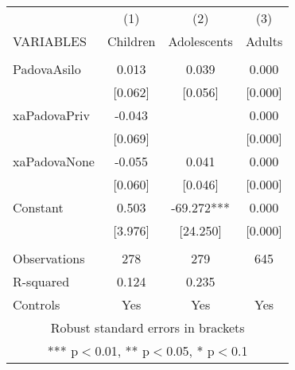 \begin{tabular}{lccc} \hline
 & (1) & (2) & (3) \\
VARIABLES & Children & Adolescents & Adults \\ \hline
 &  &  &  \\
PadovaAsilo & 0.013 & 0.039 & 0.000 \\
 & [0.062] & [0.056] & [0.000] \\
xaPadovaPriv & -0.043 &  & 0.000 \\
 & [0.069] &  & [0.000] \\
xaPadovaNone & -0.055 & 0.041 & 0.000 \\
 & [0.060] & [0.046] & [0.000] \\
Constant & 0.503 & -69.272*** & 0.000 \\
 & [3.976] & [24.250] & [0.000] \\
 &  &  &  \\
Observations & 278 & 279 & 645 \\
R-squared & 0.124 & 0.235 &  \\
 Controls & Yes & Yes & Yes \\ \hline
\multicolumn{4}{c}{ Robust standard errors in brackets} \\
\multicolumn{4}{c}{ *** p$<$0.01, ** p$<$0.05, * p$<$0.1} \\
\end{tabular}

